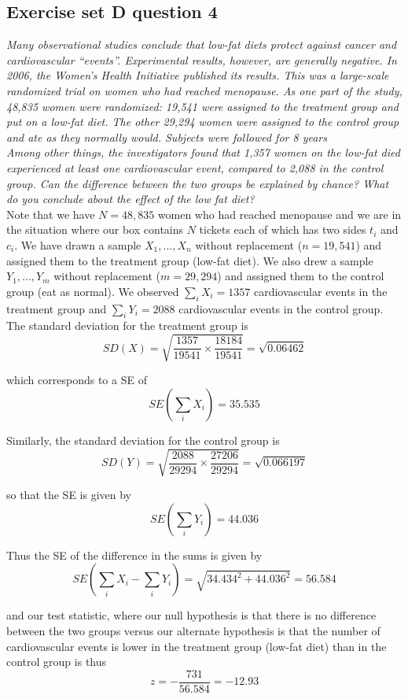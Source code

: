 \documentclass[11pt]{article}
\begin{document}
\subsection*{Exercise set D question 4} %
\noindent \textit{ Many observational studies conclude that low-fat diets protect against cancer and cardiovascular ``events''. Experimental results, however, are generally negative. In 2006, the Women's Health Initiative published its results. This was a large-scale randomized trial on women who had reached menopause. As one part of the study, 48,835 women were randomized: 19,541 were assigned to the treatment group and put on a low-fat diet. The other 29,294 women were assigned to the control group and ate as they normally would. Subjects were followed for 8 years\\
\noindent Among other things, the investigators found that 1,357 women on the low-fat died experienced at least one cardiovascular event, compared to 2,088 in the control group. Can the difference between the two groups be explained by chance? What do you conclude about the effect of the low fat diet?}\\

\noindent Note that we have $N = 48,835$ women who had reached menopause and we are in the situation where our box contains $N$ tickets each of which has two sides $t_i$ and $c_i$. We have drawn a sample $X_1, ..., X_n$ without replacement ($n = 19,541$) and assigned them to the treatment group (low-fat diet). We also drew a sample $Y_1, ..., Y_m$ without replacement ($m = 29,294$) and assigned them to the control group (eat as normal). We observed $\sum_i X_i = 1357$ cardiovascular events in the treatment group and $\sum_i Y_i = 2088$ cardiovascular events in the control group. The standard deviation for the treatment group is
$$SD(X) = \sqrt{\frac{1357}{19541} \times \frac{18184}{19541}} = \sqrt{0.06462}$$

\noindent which corresponds to a SE of
$$SE\left(\sum_i X_i\right) = 35.535$$

\noindent Similarly, the standard deviation for the control group is
$$SD(Y) = \sqrt{\frac{2088}{29294} \times \frac{27206}{29294}} = \sqrt{0.066197}$$

\noindent so that the SE is given by
$$SE\left(\sum_i Y_i\right) = 44.036$$

\noindent Thus the SE of the difference in the sums is given by
$$SE\left( \sum_i X_i - \sum_i Y_i\right) = \sqrt{34.434^2 + 44.036^2} = 56.584$$


\noindent and our test statistic, where our null hypothesis is that there is no difference between the two groups versus our alternate hypothesis is that the number of cardiovascular events is lower in the treatment group (low-fat diet) than in the control group is thus
$$z = -\frac{731}{56.584} = -12.93$$
\end{document}
